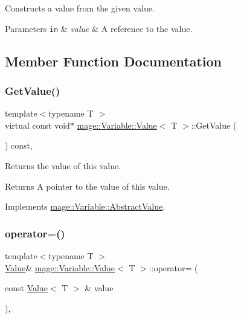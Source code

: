 Constructs a value from the given value.


\begin{DoxyParams}[1]{Parameters}
\mbox{\tt in}  & {\em value} & A reference to the value. \\
\hline
\end{DoxyParams}


\subsection{Member Function Documentation}
\hypertarget{structmage_1_1_variable_1_1_value_a04d70496ebb7ad71dafa3df877daeb26}{}\label{structmage_1_1_variable_1_1_value_a04d70496ebb7ad71dafa3df877daeb26} 
\subsubsection{\texorpdfstring{Get\+Value()}{GetValue()}}
{\footnotesize\ttfamily template$<$typename T $>$ \\
virtual const void$\ast$ \hyperlink{structmage_1_1_variable_1_1_value}{mage\+::\+Variable\+::\+Value}$<$ T $>$\+::Get\+Value (\begin{DoxyParamCaption}{ }\end{DoxyParamCaption}) const\hspace{0.3cm}{\ttfamily [override]}, {\ttfamily [virtual]}}

Returns the value of this value.

\begin{DoxyReturn}{Returns}
A pointer to the value of this value. 
\end{DoxyReturn}


Implements \hyperlink{structmage_1_1_variable_1_1_abstract_value_aede2a77b571b80794a4254e34144f4c1}{mage\+::\+Variable\+::\+Abstract\+Value}.

\hypertarget{structmage_1_1_variable_1_1_value_a19c45282edac9ffaa0f687b7dd414392}{}\label{structmage_1_1_variable_1_1_value_a19c45282edac9ffaa0f687b7dd414392} 
\subsubsection{\texorpdfstring{operator=()}{operator=()}}
{\footnotesize\ttfamily template$<$typename T $>$ \\
\hyperlink{structmage_1_1_variable_1_1_value}{Value}\& \hyperlink{structmage_1_1_variable_1_1_value}{mage\+::\+Variable\+::\+Value}$<$ T $>$\+::operator= (\begin{DoxyParamCaption}\item[{const \hyperlink{structmage_1_1_variable_1_1_value}{Value}$<$ T $>$ \&}]{value }\end{DoxyParamCaption})\hspace{0.3cm}{\ttfamily [private]}, {\ttfamily [delete]}}

